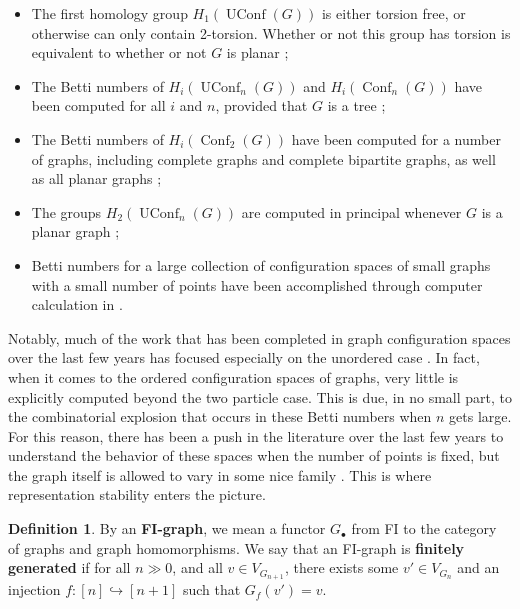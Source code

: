 \documentclass[12pt]{amsart}
\theoremstyle{definition}
\newtheorem{defn}[thm]{Definition}
\newcommand{\conf}{\operatorname{Conf}}
\newcommand{\uconf}{\operatorname{UConf}}
\begin{document}
\begin{itemize}
    \item The first homology group $H_1(\uconf(G))$ is either torsion free, or otherwise can only contain 2-torsion. Whether or not this group has torsion is equivalent to whether or not $G$ is planar \cite{KP};
    \item The Betti numbers of $H_i(\uconf_n(G))$ and $H_i(\conf_n(G))$ have been computed for all $i$ and $n$, provided that $G$ is a tree \cite{CL,Farl};
    \item The Betti numbers of $H_i(\conf_2(G))$ have been computed for a number of graphs, including complete graphs and complete bipartite graphs, as well as all planar graphs \cite{BF,FH};
    \item The groups $H_2(\uconf_n(G))$ are computed in principal whenever $G$ is a planar graph \cite{AK};
    \item Betti numbers for a large collection of configuration spaces of small graphs with a small number of points have been accomplished through computer calculation in \cite{Drum}.
\end{itemize}

Notably, much of the work that has been completed in graph configuration spaces over the last few years has focused especially on the unordered case \cite{ADCK,AK,Farl,FS,R2,Swia}. In fact, when it comes to the ordered configuration spaces of graphs, very little is explicitly computed beyond the two particle case. This is due, in no small part, to the combinatorial explosion that occurs in these Betti numbers when $n$ gets large. %
For this reason, there has been a push in the literature over the last few years to understand the behavior of these spaces when the number of points is fixed, but the graph itself is allowed to vary in some nice family \cite{KR,Lut,MR,R3,RW}. This is where representation stability enters the picture.

\begin{defn}\label{def: FIgraph}
    By an \textbf{FI-graph}, we mean a functor $G_\bullet$ from FI to the category of graphs and graph homomorphisms. We say that an FI-graph is \textbf{finitely generated} if for all $n \gg 0$, and all $v \in V_{G_{n+1}}$, there exists some $v' \in V_{G_n}$ and an injection $f:[n] \hookrightarrow [n+1]$ such that $G_f(v') = v$.
\end{defn}
\end{document}
